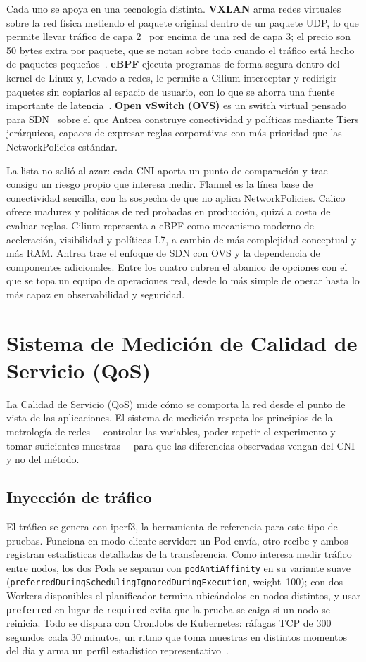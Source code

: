Cada uno se apoya en una tecnología distinta. \textbf{VXLAN} arma redes virtuales sobre la red física metiendo el paquete original dentro de un paquete UDP, lo que permite llevar tráfico de capa 2~\cite{ref19} por encima de una red de capa 3; el precio son 50 bytes extra por paquete, que se notan sobre todo cuando el tráfico está hecho de paquetes pequeños~\cite{ref12}. \textbf{eBPF} ejecuta programas de forma segura dentro del kernel de Linux y, llevado a redes, le permite a Cilium interceptar y redirigir paquetes sin copiarlos al espacio de usuario, con lo que se ahorra una fuente importante de latencia~\cite{ref27}. \textbf{Open vSwitch (OVS)} es un switch virtual pensado para SDN~\cite{ref22} sobre el que Antrea construye conectividad y políticas mediante Tiers jerárquicos, capaces de expresar reglas corporativas con más prioridad que las NetworkPolicies estándar.

La lista no salió al azar: cada CNI aporta un punto de comparación y trae consigo un riesgo propio que interesa medir. Flannel es la línea base de conectividad sencilla, con la sospecha de que no aplica NetworkPolicies. Calico ofrece madurez y políticas de red probadas en producción, quizá a costa de evaluar reglas. Cilium representa a eBPF como mecanismo moderno de aceleración, visibilidad y políticas L7, a cambio de más complejidad conceptual y más RAM. Antrea trae el enfoque de SDN con OVS y la dependencia de componentes adicionales. Entre los cuatro cubren el abanico de opciones con el que se topa un equipo de operaciones real, desde lo más simple de operar hasta lo más capaz en observabilidad y seguridad.

\section{Sistema de Medición de Calidad de Servicio (QoS)}

La Calidad de Servicio (QoS) mide cómo se comporta la red desde el punto de vista de las aplicaciones. El sistema de medición respeta los principios de la metrología de redes ---controlar las variables, poder repetir el experimento y tomar suficientes muestras--- para que las diferencias observadas vengan del CNI y no del método.

\subsection{Inyección de tráfico}

El tráfico se genera con iperf3, la herramienta de referencia para este tipo de pruebas. Funciona en modo cliente-servidor: un Pod envía, otro recibe y ambos registran estadísticas detalladas de la transferencia. Como interesa medir tráfico entre nodos, los dos Pods se separan con \texttt{podAntiAffinity} en su variante suave (\texttt{preferredDuringSchedulingIgnoredDuringExecution}, weight~100); con dos Workers disponibles el planificador termina ubicándolos en nodos distintos, y usar \texttt{preferred} en lugar de \texttt{required} evita que la prueba se caiga si un nodo se reinicia. Todo se dispara con CronJobs de Kubernetes: ráfagas TCP de 300 segundos cada 30 minutos, un ritmo que toma muestras en distintos momentos del día y arma un perfil estadístico representativo~\cite{ref7}.

